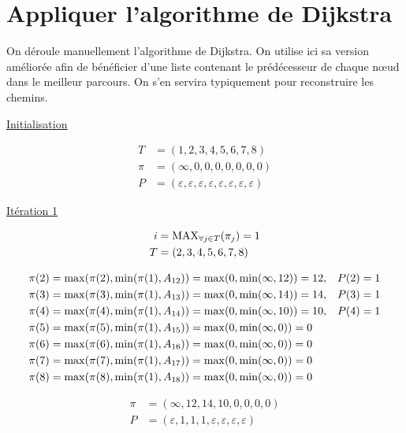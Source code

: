\documentclass{article}
\begin{document}
\section{Appliquer l'algorithme de Dijkstra }

On déroule manuellement l'algorithme de Dijkstra. On utilise ici sa
version améliorée afin de bénéficier d'une liste contenant le
prédécesseur de chaque n\oe ud dans le meilleur parcours. On s'en
servira typiquement pour reconstruire les chemins.

\newpage

\underline{Initialisation}

\begin{align*}
  T &= (1,2,3,4,5,6,7,8) \\
  \pi &= (\infty, 0,0,0,0,0,0,0) \\
  P &= (\varepsilon,\varepsilon,\varepsilon,\varepsilon,\varepsilon,\varepsilon,\varepsilon,\varepsilon)
\end{align*}

\underline{Itération 1}

\begin{align*}
  i &= \operatorname{MAX}_{\forall j \in T}(\pi_j) = 1\\
  T &= (2,3,4,5,6,7,8)
\end{align*}

\begin{align*}
  &\pi(2) = \operatorname{max}(\pi(2), \operatorname{min}(\pi(1), A_{12})) = \operatorname{max}(0, \operatorname{min}(\infty,12)) = 12, &P(2) = 1\\
  &\pi(3) = \operatorname{max}(\pi(3), \operatorname{min}(\pi(1), A_{13})) = \operatorname{max}(0, \operatorname{min}(\infty,14)) = 14, &P(3) = 1\\
  &\pi(4) = \operatorname{max}(\pi(4), \operatorname{min}(\pi(1), A_{14})) = \operatorname{max}(0, \operatorname{min}(\infty,10)) = 10, &P(4) = 1\\
  &\pi(5) = \operatorname{max}(\pi(5), \operatorname{min}(\pi(1), A_{15})) = \operatorname{max}(0, \operatorname{min}(\infty,0)) = 0\\
  &\pi(6) = \operatorname{max}(\pi(6), \operatorname{min}(\pi(1), A_{16})) = \operatorname{max}(0, \operatorname{min}(\infty,0)) = 0\\
  &\pi(7) = \operatorname{max}(\pi(7), \operatorname{min}(\pi(1), A_{17})) = \operatorname{max}(0, \operatorname{min}(\infty,0)) = 0\\
  &\pi(8) = \operatorname{max}(\pi(8), \operatorname{min}(\pi(1), A_{18})) = \operatorname{max}(0, \operatorname{min}(\infty,0)) = 0
\end{align*}

\begin{align*}
  \pi &= (\infty,12,14,10,0,0,0,0)\\
  P &= (\varepsilon, 1, 1, 1, \varepsilon, \varepsilon, \varepsilon, \varepsilon)
\end{align*}
\end{document}

